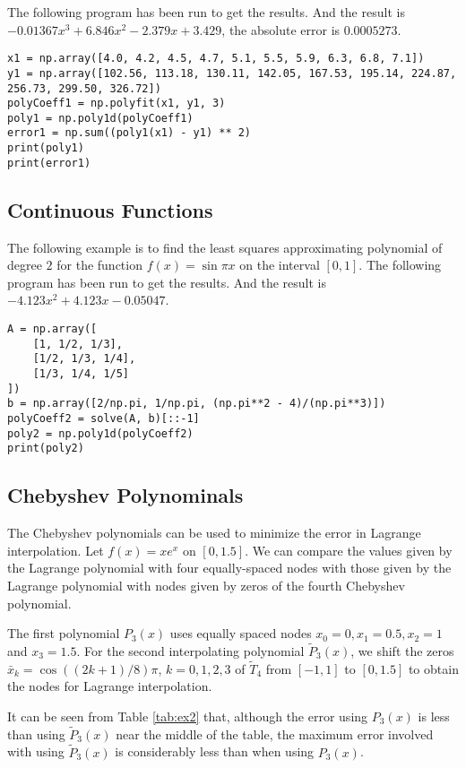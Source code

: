 \documentclass[preprint,12pt]{elsarticle}
\begin{document}
The following program has been run to get the results. And the result is $-0.01367x^3 + 6.846x^2 - 2.379x + 3.429$, the absolute error is $0.0005273$.

\begin{lstlisting}
x1 = np.array([4.0, 4.2, 4.5, 4.7, 5.1, 5.5, 5.9, 6.3, 6.8, 7.1])
y1 = np.array([102.56, 113.18, 130.11, 142.05, 167.53, 195.14, 224.87, 256.73, 299.50, 326.72])
polyCoeff1 = np.polyfit(x1, y1, 3)
poly1 = np.poly1d(polyCoeff1)
error1 = np.sum((poly1(x1) - y1) ** 2)
print(poly1)
print(error1)
\end{lstlisting}

\subsection{Continuous Functions}
\label{SS:3.2}

The following example is to find the least squares approximating polynomial of degree $2$ for the function $f(x)=\sin \pi x$ on the interval $[0, 1]$. The following program has been run to get the results. And the result is $-4.123x^2 + 4.123x - 0.05047$.

\begin{lstlisting}
A = np.array([
    [1, 1/2, 1/3],
    [1/2, 1/3, 1/4],
    [1/3, 1/4, 1/5]
])
b = np.array([2/np.pi, 1/np.pi, (np.pi**2 - 4)/(np.pi**3)])
polyCoeff2 = solve(A, b)[::-1]
poly2 = np.poly1d(polyCoeff2)
print(poly2)
\end{lstlisting}

\subsection{Chebyshev Polynominals}
\label{SS:3.3}

The Chebyshev polynomials can be used to minimize the error in Lagrange interpolation. Let $f(x)= xe^x$ on $[0, 1.5]$. We can compare the values given by the Lagrange polynomial with four equally-spaced nodes with those given by the Lagrange polynomial with nodes given by zeros of the fourth Chebyshev polynomial. 

The first polynomial $P_3(x)$ uses equally spaced nodes $x_0=0, x_1=0.5, x_2=1$ and $x_3=1.5$. For the second interpolating polynomial $\tilde{P}_3(x)$, we shift the zeros $\bar{x}_k=\cos((2k+1)/8)\pi$, $k=0,1,2,3$ of $\tilde{T}_4$ from $[-1,1]$ to $[0,1.5]$ to obtain the nodes for Lagrange interpolation.

It can be seen from Table \ref{tab:ex2} that, although the error using $P_3(x)$ is less than using $\tilde{P}_3(x)$ near the middle of the table, the maximum error involved with using $\tilde{P}_3(x)$ is considerably less than when using $P_3(x)$.
\end{document}
